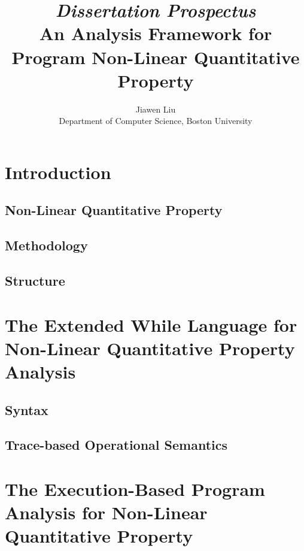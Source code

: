 \documentclass[a4paper,11pt]{article}
\begin{document}
\title{{\em Dissertation Prospectus}
\\ {An Analysis Framework for Program Non-Linear Quantitative Property}
}

\author{Jiawen Liu\\ Department of Computer Science, Boston University}
\maketitle
\begin{abstract}

\end{abstract}

\clearpage
\tableofcontents{}

\clearpage
\section{Introduction}
\label{sec:introduction}
\subsection{Non-Linear Quantitative Property}
\subsection{Methodology}
\subsection{Structure}
% 

\section{The Extended While Language for Non-Linear Quantitative Property Analysis}
\label{sec:language}
\subsection{Syntax}
\subsection{Trace-based Operational Semantics}
% 

\section{The Execution-Based Program Analysis for Non-Linear Quantitative Property}
\label{sec:dynamic}
\end{document}
